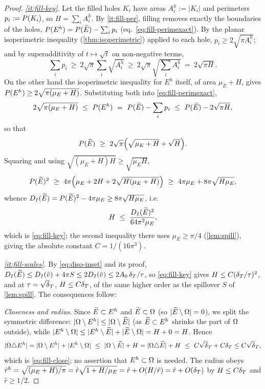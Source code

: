 \begin{proof}
\emph{\ref{it:fill-key}.} Let the filled holes $K_i$ have areas $A_i^h:=|K_i|$
and perimeters $p_i:=P(K_i)$, so $H=\sum_iA_i^h$. By \ref{it:fill-per},
filling removes exactly the boundaries of the holes, $P(E^h)=P(\widetilde{E})
-\sum_i p_i$ (eq.~\eqref{eq:fill-perimexact}).
By the planar isoperimetric inequality (\cref{thm:isoperimetric}) applied to
each hole, $p_i\ge2\sqrt{\pi A_i^h}$; and by superadditivity of
$t\mapsto\sqrt t$ on non-negative terms,
\begin{equation}\label{eq:fill-superadd}
   \sum_i p_i\ \ge\ 2\sqrt\pi\sum_i\sqrt{A_i^h}\ \ge\ 2\sqrt\pi
   \sqrt{\textstyle\sum_iA_i^h}\ =\ 2\sqrt{\pi H}.
\end{equation}
On the other hand the isoperimetric inequality for $E^h$ itself, of area
$\mu_E+H$, gives $P(E^h)\ge2\sqrt{\pi(\mu_E+H)}$. Substituting both into
\eqref{eq:fill-perimexact},
\[
   2\sqrt{\pi(\mu_E+H)}\ \le\ \Per(E^h)\ =\ \Per(\Etil)-\sum_i p_i
   \ \le\ \Per(\Etil)-2\sqrt{\pi H},
\]
so that
\[
   \Per(\Etil)\ \ge\ 2\sqrt\pi\Bigl(\sqrt{\mu_E+H}+\sqrt{H}\Bigr).
\]
Squaring and using $\sqrt{(\mu_E+H)H}\ge\sqrt{\mu_E H}$,
\[
   \Per(\Etil)^2\ \ge\ 4\pi\Bigl(\mu_E+2H+2\sqrt{H(\mu_E+H)}\Bigr)
   \ \ge\ 4\pi\mu_E+8\pi\sqrt{H\mu_E},
\]
whence $D_I(\widetilde{E})=P(\widetilde{E})^2-4\pi\mu_E\ge8\pi\sqrt{H\mu_E}$, i.e.
\[
   H\ \le\ \frac{D_I(\Etil)^2}{64\pi^2\mu_E},
\]
which is \eqref{eq:fill-key}; the second inequality there uses
$\mu_E\ge\pi/4$ (\cref{lem:spill}), giving the absolute constant
$C=1/(16\pi^3)$.

\emph{\ref{it:fill-scales}.} By \eqref{eq:diso-inset} and its proof,
$D_I(\widetilde{E})\le D_I(\hat v)+4\pi S\le2D_I(\hat v)\le2A_0\,\delta_T/\tau$, so
\eqref{eq:fill-key} gives $H\le C(\delta_T/\tau)^2$, and at $\tau=\sqrt\dT$,
$H\le C\delta_T$, of the same higher order as the spillover $S$ of
\cref{lem:spill}. The consequences follow:

\noindent\emph{Closeness and radius.} Since $\widetilde{E}\subset E^h$ and
$\widetilde{E}\subset\Omega$ (so $|\widetilde{E}\setminus\Omega|=0$), we split the symmetric
difference: $|\Omega\setminus E^h|\le|\Omega\setminus\widetilde{E}|$ (as $\widetilde{E}\subset E^h$
shrinks the part of $\Omega$ outside), while $|E^h\setminus\Omega|\le|E^h\setminus
\widetilde{E}|+|\widetilde{E}\setminus\Omega|=H+0=H$. Hence
\[
   |\Om\triangle E^h|=|\Om\setminus E^h|+|E^h\setminus\Om|
   \ \le\ |\Om\setminus\Etil|+H=|\Om\triangle\Etil|+H
   \ \le\ C\sqrt\dT+C\dT\le C\sqrt\dT,
\]
which is \eqref{eq:fill-close}; no assertion that $E^h\subset\Omega$ is needed.
The radius obeys $\hat r^h=\sqrt{(\mu_E+H)/\pi}=
\hat r\sqrt{1+H/\mu_E}=\hat r+O(H/\hat r)=\hat r+O(\delta_T)$ by $H\le C\delta_T$ and
$\hat r\ge1/2$.


\end{proof}
